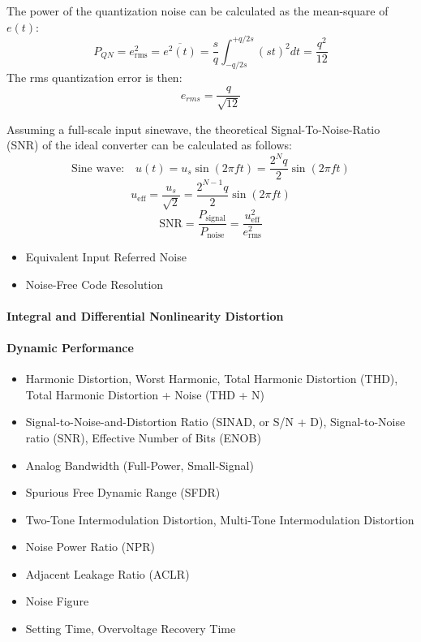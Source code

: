 The power of the quantization noise can be calculated as the mean-square of $e(t)$:
\begin{equation}
	P_{QN} = e_{\text{rms}}^{2} = \overline{e^{2}(t)} = \frac{s}{q}\int_{-q/2s}^{+q/2s} (st)^{2} dt = \frac{q^2}{12}
\end{equation}
The rms quantization error is then:
\begin{equation}
	e_{rms} = \frac{q}{\sqrt{12}}
\end{equation}

Assuming a full-scale input sinewave, the theoretical Signal-To-Noise-Ratio (SNR) of the ideal converter can be calculated as follows:
\begin{equation}
	\text{Sine wave:} \quad u(t) = u_s \sin(2\pi f t) = \frac{2^{N}q}{2}\sin(2\pi f t)
\end{equation}
\begin{equation}
	u_{\text{eff}} = \frac{u_s}{\sqrt{2}} = \frac{2^{N-1}q}{2}\sin(2\pi f t)
\end{equation}
\begin{equation}
	\text{SNR} = \frac{P_{\text{signal}}}{P_{\text{noise}}} = \frac{u_{\text{eff}}^{2}}{e_{\text{rms}}^{2}}
\end{equation}

\begin{itemize}
\item Equivalent Input Referred Noise
\item Noise-Free Code Resolution
\end{itemize}
\paragraph{Integral and Differential Nonlinearity Distortion} 

\paragraph{Dynamic Performance}

\begin{itemize}
\item Harmonic Distortion, Worst Harmonic, Total Harmonic Distortion (THD), Total Harmonic Distortion + Noise (THD + N)
\item Signal-to-Noise-and-Distortion Ratio (SINAD, or S/N + D), Signal-to-Noise ratio (SNR), Effective Number of Bits (ENOB)
\item Analog Bandwidth (Full-Power, Small-Signal)
\item Spurious Free Dynamic Range (SFDR)
\item Two-Tone Intermodulation Distortion, Multi-Tone Intermodulation Distortion
\item Noise Power Ratio (NPR)
\item Adjacent Leakage Ratio (ACLR)
\item Noise Figure
\item Setting Time, Overvoltage Recovery Time
\end{itemize}


